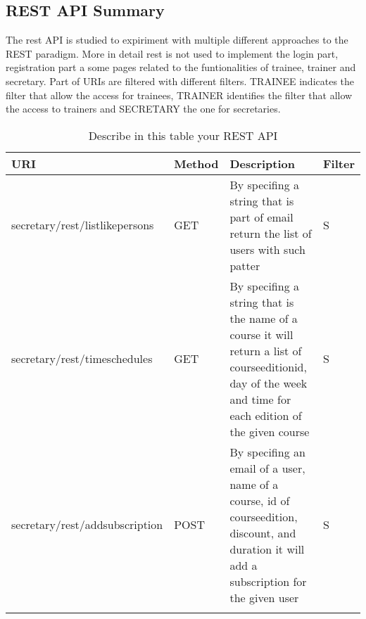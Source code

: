\subsection{REST API Summary}

The rest API is studied to expiriment with multiple different approaches to the REST paradigm. 
More in detail rest is not used to implement the login part, registration part a some pages related to the funtionalities of trainee, trainer and secretary.
Part of URIs are filtered with different filters. TRAINEE indicates the filter that allow the access for trainees, TRAINER identifies the filter that allow the
access to trainers and SECRETARY the one for secretaries.



\begin{longtable}{|p{}|p{} |p{}|p{}|} 
\hline
\textbf{URI} & \textbf{Method} & \textbf{Description} & \textbf{Filter} \\\hline
secretary/rest/listlikepersons & GET & By specifing a string that is part of email return the list of users with such patter  & S\\\hline

secretary/rest/timeschedules & GET & By specifing a string that is the name of a course it will return a list of courseeditionid, day of the week and time for each edition of the given course  & S\\\hline

secretary/rest/addsubscription & POST & By specifing an email of a user, name of a course, id of courseedition, discount, and duration it will add a subscription for the given user  & S\\\hline


\caption{Describe in this table your REST API}
\label{tab:termGlossary}
\end{longtable}